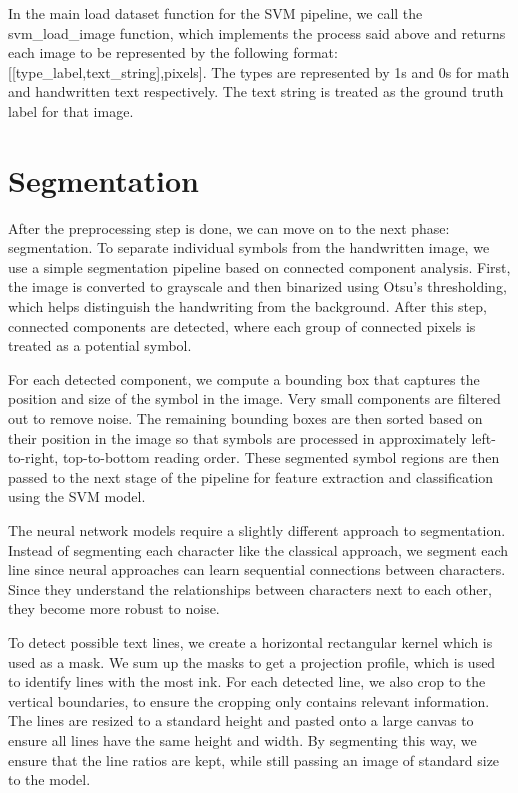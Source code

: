 \documentclass[11pt]{article}
\begin{document}
In the main load dataset function for the SVM pipeline, we call the svm\_load\_image function, which implements the process said above and returns each image to be represented by the following format: [[type\_label,text\_string],pixels]. The types are represented by 1s and 0s for math and handwritten text respectively. The text string is treated as the ground truth label for that image.

\section{Segmentation}

After the preprocessing step is done, we can move on to the next phase: segmentation. To separate individual symbols from the handwritten image, we use a simple segmentation pipeline based on connected component analysis. First, the image is converted to grayscale and then binarized using Otsu's thresholding, which helps distinguish the handwriting from the background. After this step, connected components are detected, where each group of connected pixels is treated as a potential symbol.

For each detected component, we compute a bounding box that captures the position and size of the symbol in the image. Very small components are filtered out to remove noise. The remaining bounding boxes are then sorted based on their position in the image so that symbols are processed in approximately left-to-right, top-to-bottom reading order. These segmented symbol regions are then passed to the next stage of the pipeline for feature extraction and classification using the SVM model.

The neural network models require a slightly different approach to segmentation. Instead of segmenting each character like the classical approach, we segment each line since neural approaches can learn sequential connections between characters. Since they understand the relationships between characters next to each other, they become more robust to noise.

To detect possible text lines, we create a horizontal rectangular kernel which is used as a mask. We sum up the masks to get a projection profile, which is used to identify lines with the most ink. For each detected line, we also crop to the vertical boundaries, to ensure the cropping only contains relevant information. The lines are resized to a standard height and pasted onto a large canvas to ensure all lines have the same height and width. By segmenting this way, we ensure that the line ratios are kept, while still passing an image of standard size to the model.
\end{document}
